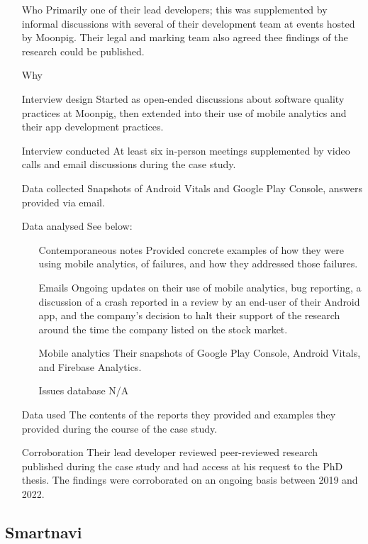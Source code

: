 \begin{itemize}
    \item[Who] 
    Primarily one of their lead developers; this was supplemented by informal discussions with several of their development team at events hosted by Moonpig. Their legal and marking team also agreed thee findings of the research could be published.
    \item[Why]
    \item[Interview design] 
    Started as open-ended discussions about software quality practices at Moonpig, then extended into their use of mobile analytics and their app development practices. 
    \item[Interview conducted] 
    At least six in-person meetings supplemented by video calls and email discussions during the case study.
    \item[Data collected] 
    Snapshots of Android Vitals and Google Play Console, answers provided via email.
    \item[Data analysed] 
    See below:
    \begin{itemize}
        \item[Contemporaneous notes]  
        Provided concrete examples of how they were using mobile analytics, of failures, and how they addressed those failures.
        \item[Emails] 
        Ongoing updates on their use of mobile analytics, bug reporting, a discussion of a crash reported in a review by an end-user of their Android app, and the company's decision to halt their support of the research around the time the company listed on the stock market.
        \item[Mobile analytics] 
        Their snapshots of Google Play Console, Android Vitals, and Firebase Analytics.
        \item[Issues database] 
        N/A
    \end{itemize}
    \item[Data used] 
    The contents of the reports they provided and examples they provided during the course of the case study.
    \item[Corroboration] 
    Their lead developer reviewed peer-reviewed research published during the case study and had access at his request to the PhD thesis. The findings were corroborated on an ongoing basis between 2019 and 2022.
\end{itemize}

\subsection{Smartnavi}

